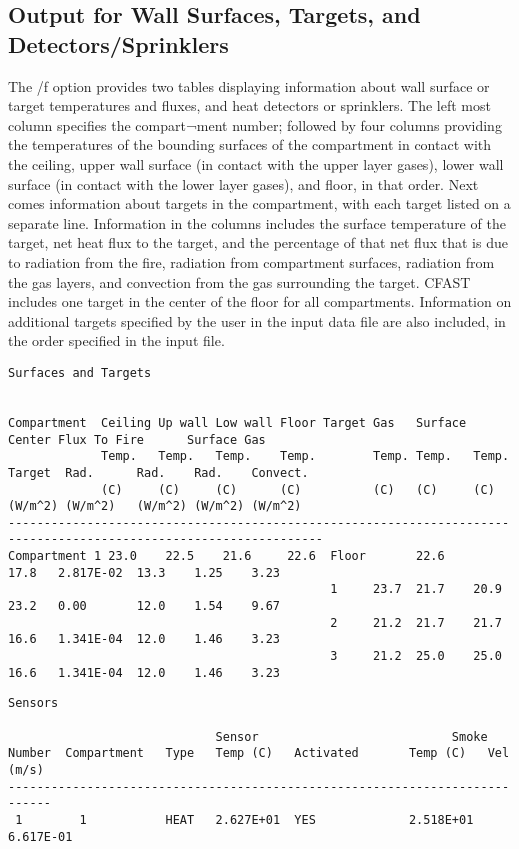 \subsection{Output for Wall Surfaces, Targets, and Detectors/Sprinklers}

The /f option provides two tables displaying information about wall surface or target temperatures and fluxes, and heat detectors or sprinklers. The left most column specifies the compart¬ment number; followed by four columns providing the temperatures of the bounding surfaces of the compartment in contact with the ceiling, upper wall surface (in contact with the upper layer gases), lower wall surface (in contact with the lower layer gases), and floor, in that order. Next comes information about targets in the compartment, with each target listed on a separate line.  Information in the columns includes the surface temperature of the target, net heat flux to the target, and the percentage of that net flux that is due to radiation from the fire, radiation from compartment surfaces, radiation from the gas layers, and convection from the gas surrounding the target.  CFAST includes one target in the center of the floor for all compartments. Information on additional targets specified by the user in the input data file are also included, in the order specified in the input file.

\begin{lstlisting}[basicstyle=\tiny]
Surfaces and Targets


Compartment  Ceiling Up wall Low wall Floor Target Gas   Surface Center Flux To Fire      Surface Gas
             Temp.   Temp.   Temp.    Temp.        Temp. Temp.   Temp.  Target  Rad.      Rad.    Rad.    Convect.
             (C)     (C)     (C)      (C)          (C)   (C)     (C)    (W/m^2) (W/m^2)   (W/m^2) (W/m^2) (W/m^2)      
------------------------------------------------------------------------------------------------------------------
Compartment 1 23.0    22.5    21.6     22.6  Floor       22.6            17.8   2.817E-02  13.3    1.25    3.23    
                                             1     23.7  21.7    20.9    23.2   0.00       12.0    1.54    9.67    
                                             2     21.2  21.7    21.7    16.6   1.341E-04  12.0    1.46    3.23    
                                             3     21.2  25.0    25.0    16.6   1.341E-04  12.0    1.46    3.23    
\end{lstlisting}
\newpage
\begin{lstlisting}[basicstyle=\tiny]
Sensors

                             Sensor                           Smoke
Number  Compartment   Type   Temp (C)   Activated       Temp (C)   Vel (m/s)
----------------------------------------------------------------------------
 1        1           HEAT   2.627E+01  YES             2.518E+01  6.617E-01
 \end{lstlisting}

